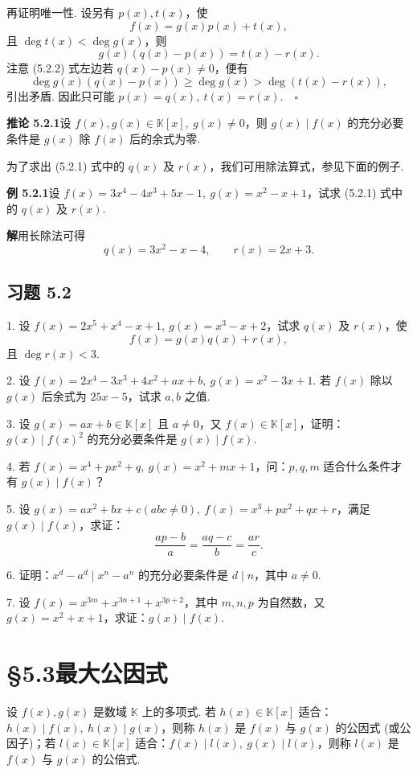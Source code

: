 \documentclass[UTF8, 12pt, fontset=fandol, oneside]{ctexart}
\begin{document}
再证明唯一性. 设另有 $p(x),t(x)$，使
\[
f(x)=g(x)p(x)+t(x),
\]
且 $\deg t(x)<\deg g(x)$，则
\begin{equation}
g(x)(q(x)-p(x))=t(x)-r(x).
\tag{5.2.2}
\end{equation}
注意 (5.2.2) 式左边若 $q(x)-p(x)\neq 0$，便有
\[
\deg g(x)(q(x)-p(x))\geq \deg g(x)>\deg(t(x)-r(x)),
\]
引出矛盾. 因此只可能 $p(x)=q(x),\ t(x)=r(x).\quad \square$

\noindent\textbf{推论 5.2.1}\quad 设 $f(x),g(x)\in\mathbb{K}[x],\ g(x)\neq 0$，则 $g(x)\mid f(x)$ 的充分必要条件是 $g(x)$ 除 $f(x)$ 后的余式为零.

为了求出 (5.2.1) 式中的 $q(x)$ 及 $r(x)$，我们可用除法算式，参见下面的例子.

\noindent\textbf{例 5.2.1}\quad 设 $f(x)=3x^4-4x^3+5x-1,\ g(x)=x^2-x+1$，试求 (5.2.1) 式中的 $q(x)$ 及 $r(x)$.

\noindent\textbf{解}\quad 用长除法可得
\[
q(x)=3x^2-x-4,\qquad r(x)=2x+3.
\]

\subsection*{习题 5.2}

1. 设 $f(x)=2x^5+x^4-x+1,\ g(x)=x^3-x+2$，试求 $q(x)$ 及 $r(x)$，使
\[
f(x)=g(x)q(x)+r(x),
\]
且 $\deg r(x)<3$.

2. 设 $f(x)=2x^4-3x^3+4x^2+ax+b,\ g(x)=x^2-3x+1$. 若 $f(x)$ 除以 $g(x)$ 后余式为 $25x-5$，试求 $a,b$ 之值.

3. 设 $g(x)=ax+b\in\mathbb{K}[x]$ 且 $a\neq 0$，又 $f(x)\in\mathbb{K}[x]$，证明：$g(x)\mid f(x)^2$ 的充分必要条件是 $g(x)\mid f(x)$.

4. 若 $f(x)=x^4+px^2+q,\ g(x)=x^2+mx+1$，问：$p,q,m$ 适合什么条件才有 $g(x)\mid f(x)$？

5. 设 $g(x)=ax^2+bx+c(abc\neq 0),\ f(x)=x^3+px^2+qx+r$，满足 $g(x)\mid f(x)$，求证：
\[
\frac{ap-b}{a}=\frac{aq-c}{b}=\frac{ar}{c}.
\]

6. 证明：$x^d-a^d\mid x^n-a^n$ 的充分必要条件是 $d\mid n$，其中 $a\neq 0$.

7. 设 $f(x)=x^{3m}+x^{3n+1}+x^{3p+2}$，其中 $m,n,p$ 为自然数，又 $g(x)=x^2+x+1$，求证：$g(x)\mid f(x)$.

\section*{§5.3\quad 最大公因式}

设 $f(x),g(x)$ 是数域 $\mathbb{K}$ 上的多项式. 若 $h(x)\in\mathbb{K}[x]$ 适合：$h(x)\mid f(x),\ h(x)\mid g(x)$，则称 $h(x)$ 是 $f(x)$ 与 $g(x)$ 的公因式 (或公因子)；若 $l(x)\in\mathbb{K}[x]$ 适合：$f(x)\mid l(x),\ g(x)\mid l(x)$，则称 $l(x)$ 是 $f(x)$ 与 $g(x)$ 的公倍式.
\end{document}
